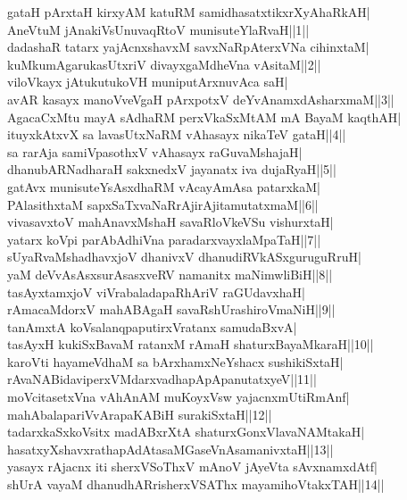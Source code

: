 \documentclass{article}
\begin{document}
gataH pArxtaH kirxyAM katuRM samidhasatxtikxrXyAhaRkAH|\\
AneVtuM jAnakiVsUnuvaqRtoV munisuteYlaRvaH||1||\\
dadashaR tatarx yajAcnxshavxM savxNaRpAterxVNa cihinxtaM|\\
kuMkumAgarukasUtxriV divayxgaMdheVna vAsitaM||2||\\
viloVkayx jAtukutukoVH muniputArxnuvAca saH|\\
avAR kasayx manoVveVgaH pArxpotxV deYvAnamxdAsharxmaM||3||\\
AgacaCxMtu mayA sAdhaRM perxVkaSxMtAM mA BayaM kaqthAH|\\
ituyxkAtxvX sa lavasUtxNaRM vAhasayx nikaTeV gataH||4||\\
sa rarAja samiVpasothxV vAhasayx raGuvaMshajaH|\\
dhanubARNadharaH sakxnedxV jayanatx iva dujaRyaH||5||\\
gatAvx munisuteYsAsxdhaRM vAcayAmAsa patarxkaM|\\
PAlasithxtaM sapxSaTxvaNaRrAjirAjitamutatxmaM||6||\\
vivasavxtoV mahAnavxMshaH savaRloVkeVSu vishurxtaH|\\
yatarx koVpi parAbAdhiVna paradarxvayxlaMpaTaH||7||\\
sUyaRvaMshadhavxjoV dhanivxV dhanudiRVkASxguruguRruH|\\
yaM deVvAsAsxsurAsasxveRV namanitx maNimwliBiH||8||\\
tasAyxtamxjoV viVrabaladapaRhAriV raGUdavxhaH|\\
rAmacaMdorxV mahABAgaH savaRshUrashiroVmaNiH||9||\\
tanAmxtA koVsalanqpaputirxVratanx samudaBxvA|\\
tasAyxH kukiSxBavaM ratanxM rAmaH shaturxBayaMkaraH||10||\\
karoVti hayameVdhaM sa bArxhamxNeYshacx sushikiSxtaH|\\
rAvaNABidaviperxVMdarxvadhapApApanutatxyeV||11||\\
moVcitasetxVna vAhAnAM muKoyxVsw yajacnxmUtiRmAnf|\\
mahAbalapariVvArapaKABiH surakiSxtaH||12||\\
tadarxkaSxkoVsitx madABxrXtA shaturxGonxVlavaNAMtakaH|\\
hasatxyXshavxrathapAdAtasaMGaseVnAsamanivxtaH||13||\\
yasayx rAjacnx iti sherxVSoThxV mAnoV jAyeVta sAvxnamxdAtf|\\
shUrA vayaM dhanudhARrisherxVSAThx mayamihoVtakxTAH||14||\\
\end{document}
